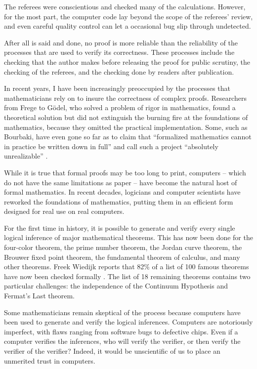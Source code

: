 The referees were conscientious and checked many of the calculations.
However, for the most part, the computer code lay beyond the scope of
the referees' review, and even careful quality control can let a
occasional bug slip through undetected.


After all is said and done, no proof is more reliable than the
reliability of the processes that are used to verify its
correctness.  These processes include the checking that the author
makes before releasing the proof for public scrutiny, the checking
of the referees, and the checking done by readers after publication.

In recent years, I have been increasingly preoccupied by the
processes that mathematicians rely on to insure the correctness of complex
proofs. Researchers from Frege to G\"odel, who solved a problem of
rigor in mathematics, found a theoretical solution but did not
extinguish the burning fire at the foundations of mathematics,
because they omitted the practical implementation. Some, such as
Bourbaki, have even gone so far as to claim that ``formalized
mathematics cannot in practice be written down in full'' and call
such a project
``absolutely unrealizable'' \cite[p 10,11]{Bour:68:Sets}. %

While it is true that formal proofs may be too long to print,
computers -- which do not have the same limitations as paper -- have
become the natural host of formal mathematics. In recent decades,
logicians and computer scientists have reworked the foundations of
mathematics, putting them in an efficient form designed for real use
on real computers.

For the first time in history, it is possible to generate and verify
every single logical inference of major mathematical theorems.  This
has now been done for the four-color theorem, the prime number
theorem, the Jordan curve theorem, the Brouwer fixed point theorem,
the fundamental theorem of calculus, and many other theorems.  Freek
Wiedijk reports that 82\% of a list of 100 famous theorems have now
been checked formally \cite{wiedijk:100}.  The list of 18 remaining
theorems contains two particular challenges: the independence of the
Continuum Hypothesis and Fermat's Last theorem.

Some mathematicians remain skeptical of the process because
computers have been used to generate and verify the logical
inferences.  Computers are notoriously imperfect, with flaws ranging
from software bugs to defective chips.  Even if a computer verifies
the inferences, who will verify the verifier, or then verify the
verifier of the verifier?  
Indeed, it would be unscientific of us to
place an unmerited trust in computers.

